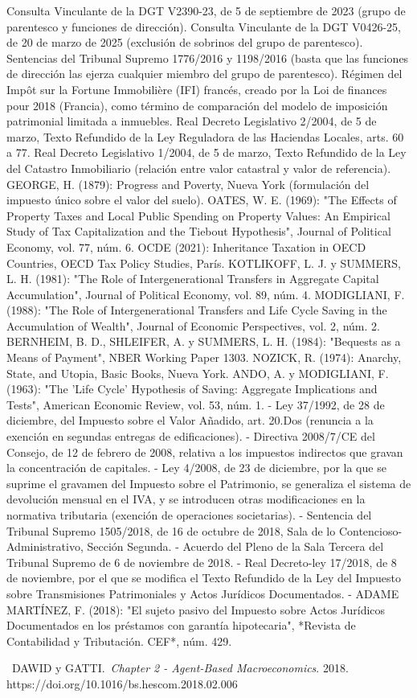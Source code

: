 \documentclass[10pt,a4paper]{article}
\newcounter{myref}
\newcommand{\MyBibItem}[4]{%
  \refstepcounter{myref}%
  \noindent[\themyref]\ #1.\ \emph{#2}. #3. #4\par
}
\begin{document}
Consulta Vinculante de la DGT V2390-23, de 5 de septiembre de 2023 (grupo de parentesco y funciones de dirección).
Consulta Vinculante de la DGT V0426-25, de 20 de marzo de 2025 (exclusión de sobrinos del grupo de parentesco).
Sentencias del Tribunal Supremo 1776/2016 y 1198/2016 (basta que las funciones de dirección las ejerza cualquier miembro del grupo de parentesco).
Régimen del Impôt sur la Fortune Immobilière (IFI) francés, creado por la Loi de finances pour 2018 (Francia), como término de comparación del modelo de imposición patrimonial limitada a inmuebles.
Real Decreto Legislativo 2/2004, de 5 de marzo, Texto Refundido de la Ley Reguladora de las Haciendas Locales, arts. 60 a 77.
Real Decreto Legislativo 1/2004, de 5 de marzo, Texto Refundido de la Ley del Catastro Inmobiliario (relación entre valor catastral y valor de referencia).
GEORGE, H. (1879): Progress and Poverty, Nueva York (formulación del impuesto único sobre el valor del suelo).
OATES, W. E. (1969): "The Effects of Property Taxes and Local Public Spending on Property Values: An Empirical Study of Tax Capitalization and the Tiebout Hypothesis", Journal of Political Economy, vol. 77, núm. 6.
OCDE (2021): Inheritance Taxation in OECD Countries, OECD Tax Policy Studies, París.
KOTLIKOFF, L. J. y SUMMERS, L. H. (1981): "The Role of Intergenerational Transfers in Aggregate Capital Accumulation", Journal of Political Economy, vol. 89, núm. 4.
MODIGLIANI, F. (1988): "The Role of Intergenerational Transfers and Life Cycle Saving in the Accumulation of Wealth", Journal of Economic Perspectives, vol. 2, núm. 2.
BERNHEIM, B. D., SHLEIFER, A. y SUMMERS, L. H. (1984): "Bequests as a Means of Payment", NBER Working Paper 1303.
NOZICK, R. (1974): Anarchy, State, and Utopia, Basic Books, Nueva York.
ANDO, A. y MODIGLIANI, F. (1963): "The 'Life Cycle' Hypothesis of Saving: Aggregate Implications and Tests", American Economic Review, vol. 53, núm. 1.
- Ley 37/1992, de 28 de diciembre, del Impuesto sobre el Valor Añadido, art. 20.Dos (renuncia a la exención en segundas entregas de edificaciones).
- Directiva 2008/7/CE del Consejo, de 12 de febrero de 2008, relativa a los impuestos indirectos que gravan la concentración de capitales.
- Ley 4/2008, de 23 de diciembre, por la que se suprime el gravamen del Impuesto sobre el Patrimonio, se generaliza el sistema de devolución mensual en el IVA, y se introducen otras modificaciones en la normativa tributaria (exención de operaciones societarias).
- Sentencia del Tribunal Supremo 1505/2018, de 16 de octubre de 2018, Sala de lo Contencioso-Administrativo, Sección Segunda.
- Acuerdo del Pleno de la Sala Tercera del Tribunal Supremo de 6 de noviembre de 2018.
- Real Decreto-ley 17/2018, de 8 de noviembre, por el que se modifica el Texto Refundido de la Ley del Impuesto sobre Transmisiones Patrimoniales y Actos Jurídicos Documentados.
- ADAME MARTÍNEZ, F. (2018): "El sujeto pasivo del Impuesto sobre Actos Jurídicos Documentados en los préstamos con garantía hipotecaria", *Revista de Contabilidad y Tributación. CEF*, núm. 429.




\MyBibItem{DAWID y GATTI}{Chapter 2 - Agent-Based Macroeconomics}{2018}{https://doi.org/10.1016/bs.hescom.2018.02.006}


\clearpage
\end{document}
